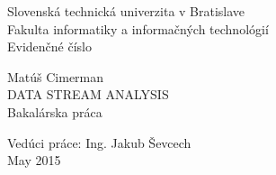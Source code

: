 \documentclass[11pt, a4paper, titlepage, slovak]{book}
\begin{document}
\sloppy %




\frontmatter

\begin{titlepage}
\begin{center}                                                                                                                                                   
{\Large Slovenská technická univerzita v Bratislave} \\
{\Large Fakulta informatiky a informačných technológií} \\
\vspace*{1\baselineskip}
\large {Evidenčné číslo}
\vfill %


{\LARGE {Matúš Cimerman}} \\
\vspace*{1\baselineskip}
{\huge \uppercase {Data Stream Analysis}} %
\\
\vspace*{1\baselineskip}
{\Large {Bakalárska práca}}\\
\vfill %
\end{center}
{Vedúci práce: Ing. Jakub Ševcech}\\
\vspace*{1\baselineskip}
{May 2015}

\end{titlepage}
\restoregeometry
\thispagestyle{empty}
\emptydoublepage

%


\emptydoublepage


\emptydoublepage

%
\end{document}
